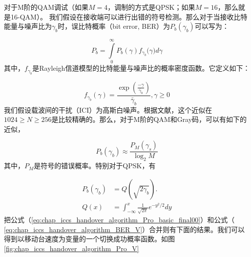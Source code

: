 对于M阶的QAM调试（如果$M=4$，调制的方式是QPSK；如果$M=16$，那么就是16-QAM）。
我们假设在接收端可以进行出错的符号检测。那么对于当接收比特能量与噪声比为$\gamma_b$时，误比特概率（bit error, BER）为$P_b(\gamma_b)$可以写为：

\[
{{P}_{b}}=\int\limits_{0}^{\infty }{{{P}_{b}}(\gamma ){{f}_{{{\gamma }_{b}}}}(}\gamma )d\gamma
\]
其中，$f_{\gamma_b}$是Rayleigh信道模型的比特能量与噪声比的概率密度函数。它定义如下：

\[{{f}_{{{\gamma }_{b}}}}(\gamma )=\frac{\exp (\frac{-\gamma }{{{{\bar{\gamma }}}_{b}}})}{{{{\bar{\gamma }}}_{b}}},\gamma \ge 0\]
我们假设载波间的干扰（ICI）为高斯白噪声。根据文献\cite{Leung:WCNC2005}，这个近似在$1024\ge N \ge 256$是比较精确的。那么，对于M阶的QAM和Gray码，可以有如下的近似，

\begin{equation}
P_b(\gamma_b) \approx \frac{P_M(\gamma_s)}{\log_2 M}
\end{equation}
其中，$P_M$是符号的错误概率。特别对于QPSK，有

\begin{align}
\label{eq:chap_iccs_handover_algorithm_BER_V}
P_{b}(\gamma_{b})&= Q\left(\sqrt{2\gamma_{b}}\right).\\
Q(x) &= \int^x_{-\infty} \frac{1}{\sqrt{2\pi}}e^{-y^2/2}dy
\end{align}
把公式（\ref{eq:chap_iccs_handover_algorithm_Pro_basic_final00}）和公式（ \ref{eq:chap_iccs_handover_algorithm_BER_V}）合并则有下面的结果。我们可以得到以移动台速度为变量的一个切换成功概率函数。如图\ref{fig:chap_iccs_handover_algorithm_Pro_V}

